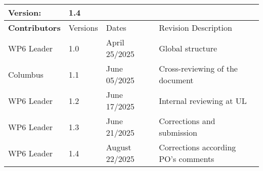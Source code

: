 \begin{tabular}{ >{\raggedright\arraybackslash}p{3cm}| p{2cm} p{4cm} p{6cm} }
    \toprule
    \textbf{Version}: & \multicolumn{3}{l}{ 1.4} \\ \midrule
    \textbf{Contributors}  & Versions    & Dates       & Revision Description \\ \midrule
    WP6 Leader  & 1.0    & April 25/2025  & Global structure  \\ 
    Columbus  & 1.1    & June 05/2025  & Cross-reviewing of the document  \\ 
    WP6 Leader  & 1.2   & June 17/2025  & Internal reviewing at UL \\ 
    WP6 Leader  & 1.3   & June 21/2025  & Corrections and submission  \\ 
    WP6 Leader  & 1.4   & August 22/2025  & Corrections according PO's comments  \\ 
    \bottomrule
\end{tabular}  
